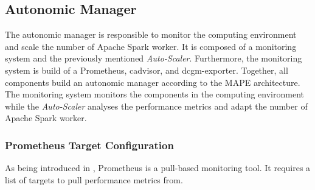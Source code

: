 \subsection{Autonomic Manager}
The autonomic manager is responsible to monitor the computing environment and scale the number of Apache Spark worker.
It is composed of a monitoring system and the previously mentioned \textit{Auto-Scaler}.
Furthermore, the monitoring system is build of a Prometheus, cadvisor, and dcgm-exporter.
Together, all components build an autonomic manager according to the MAPE architecture.
The monitoring system monitors the components in the computing environment while the \textit{Auto-Scaler} analyses the performance metrics and adapt the number of Apache Spark worker.




\subsubsection{Prometheus Target Configuration}




As being introduced in , Prometheus is a pull-based monitoring tool.
It requires a list of targets to pull performance metrics from.


